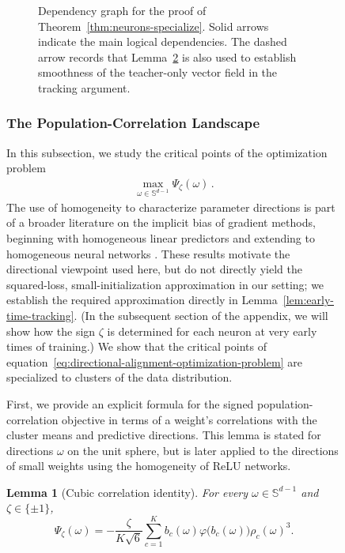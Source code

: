 \documentclass{article}
\def\eqref#1{equation~\ref{#1}}
\newcounter{setting}[section]
\newcounter{initialization}[section]
\newtheorem{lemma}[lemma]{Lemma}
\begin{document}
\begin{figure}
{\begin{figure}[ht!]
{\begin{tikzpicture}
\end{tikzpicture}%
}
\caption{
Dependency graph for the proof of
Theorem~\ref{thm:neurons-specialize}.
Solid arrows indicate the main logical dependencies.
The dashed arrow records that
Lemma~\ref{lem:cubic-correlation-identity}
is also used to establish smoothness of the teacher-only
vector field in the tracking argument.
}
\label{fig:theorem1-dependencies}
\end{figure}
}
\clearpage

\subsubsection{The Population-Correlation Landscape}

In this subsection, we study the critical points of the optimization problem
\begin{align}\label{eq:directional-alignment-optimization-problem}
\max_{\omega \in \mathbb{S}^{d-1}} \Psi_{\zeta}(\omega)\,.
\end{align}
The use of homogeneity to characterize parameter directions
is part of a broader literature on the implicit bias of gradient methods,
beginning with homogeneous linear predictors and extending to homogeneous
neural networks
\citep{soudry2018implicit,ji2019implicit,lyu2020gradient,ji2020directional}.
These results motivate the directional viewpoint used here, but do not
directly yield the squared-loss, small-initialization approximation in our
setting; we establish the required approximation directly in
Lemma~\ref{lem:early-time-tracking}. (In the subsequent section of the appendix, we will show how the sign $\zeta$ is determined for each neuron at very early times of training.) We show that the critical points of \eqref{eq:directional-alignment-optimization-problem} are specialized to clusters of the data distribution.

First, we provide an explicit formula for the signed population-correlation objective in terms of a weight's correlations with the cluster means and predictive directions. This lemma is stated for directions $\omega$ on the unit sphere, but is later applied to the directions of small weights using the homogeneity of ReLU networks.

\begin{lemma}[Cubic correlation identity]
\label{lem:cubic-correlation-identity}
For every $\omega\in\mathbb S^{d-1}$ and $\zeta\in\{\pm1\}$,
\[
    \Psi_\zeta(\omega)
    =
    -\frac{\zeta}{K\sqrt6}
    \sum_{c=1}^K
    b_c(\omega)\varphi\bigl(b_c(\omega)\bigr)\rho_c(\omega)^3.
\]
\end{lemma}


\end{figure}
\end{document}
